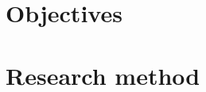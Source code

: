 \documentclass[12pt]{report}
\begin{document}
\section{Objectives}


\section{Research method}
\end{document}
